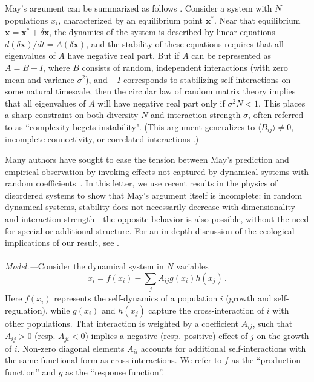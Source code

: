 \documentclass[
 prl,
 twocolumn,
 amsmath,
 amssymb,
 aps,
]{revtex4-2}
\begin{document}
May's argument can be summarized as follows \cite{May1972}.
Consider a system with $N$ populations $x_i$, characterized by an equilibrium point $\mathbf x^*$.
Near that equilibrium $\mathbf x = \mathbf x^* + \delta \mathbf x$, the dynamics of the system is described by linear equations $d(\delta \mathbf x)/dt = A (\delta \mathbf x)$, and the stability of these equations requires that all eigenvalues of $A$ have negative real part.
But if $A$ can be represented as $A = B - I$, where $B$ consists of random, independent interactions (with zero 
mean and variance $\sigma^2$), and $-I$ corresponds to stabilizing self-interactions on some natural timescale, 
then the circular law of random matrix theory implies that all eigenvalues of $A$ will have negative real part only if $\sigma^2 N < 1$.
This places a sharp constraint on both diversity $N$ and interaction strength $\sigma$, often referred to as ``complexity begets instability".
(This argument generalizes to $\langle B_{ij}\rangle \neq 0$, incomplete connectivity, or correlated interactions \cite{allesina2015stability}.)

Many authors have sought to ease the tension between May's prediction and empirical observation by invoking effects not captured by dynamical systems with random coefficients~\cite{McCann2000,Chesson2000,Mougi2012,Rohr2014,Barabas2017,Grilli2017}. 
In this letter, we use recent results in the physics of disordered systems \cite{Ahmadian2015, Roy2019} to show that May's argument itself is incomplete: in random dynamical systems, stability does not necessarily decrease with dimensionality and interaction strength---the opposite behavior is also possible, without the need for special or additional structure.
For an in-depth discussion of the ecological implications of our result, see \cite{Hatton2024}.

\paragraph*{}
\emph{Model.---}Consider the dynamical system in $N$ variables
\begin{equation}\label{dynamics}
    \dot{x}_i = f(x_i) - \sum_{j}A_{ij}g(x_i)h(x_j) \, .
\end{equation}
Here $f(x_i)$ represents the self-dynamics of a population $i$ (growth and self-regulation), while $g(x_i)$ and $h(x_j)$ capture the cross-interaction of $i$ with other populations. That interaction is weighted by a coefficient $A_{ij}$, such that $A_{ij} > 0$ (resp.
$A_{ji} < 0$) implies a negative (resp.
positive) effect of $j$ on the growth of $i$. Non-zero diagonal elements $A_{ii}$ accounts for additional self-interactions with the same functional form as cross-interactions. 
We refer to $f$ as the ``production function'' and $g$ as the ``response function''.
\end{document}
